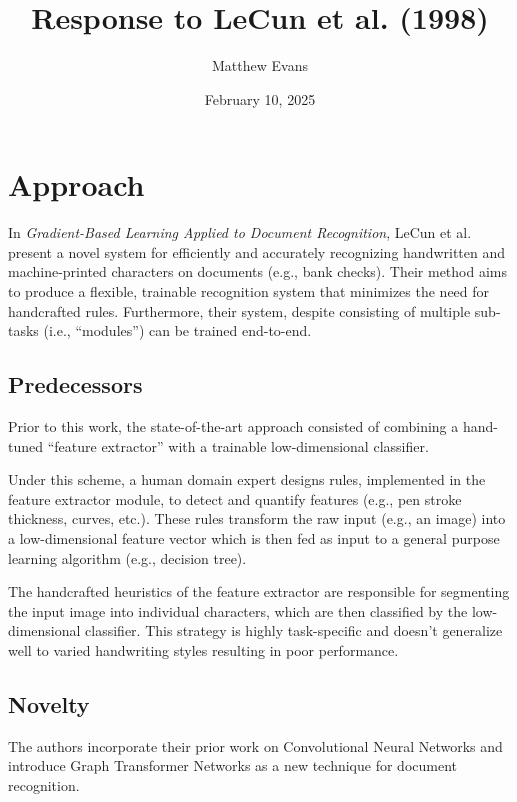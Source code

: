\documentclass[10pt]{article}
\title{
    Response to LeCun et al. (1998) \\
}
\author{Matthew Evans}
\date{February 10, 2025}
\begin{document}
\maketitle

\section*{Approach}
In \textit{Gradient-Based Learning Applied to Document Recognition}\cite{lecun1998gradient}, LeCun et al. present a novel system for efficiently and accurately recognizing handwritten and machine-printed characters on documents (e.g., bank checks). Their method aims to produce a flexible, trainable recognition system that minimizes the need for handcrafted rules. Furthermore, their system, despite consisting of multiple sub-tasks (i.e., ``modules'') can be trained end-to-end.


\subsection*{Predecessors}


Prior to this work, the state-of-the-art approach consisted of combining a hand-tuned ``feature extractor'' with a trainable low-dimensional classifier.

Under this scheme, a human domain expert designs rules, implemented in the feature extractor module, to detect and quantify features (e.g., pen stroke thickness, curves, etc.). These rules transform the raw input (e.g., an image) into a low-dimensional feature vector which is then fed as input to a general purpose learning algorithm (e.g., decision tree).

The handcrafted heuristics of the feature extractor are responsible for segmenting the input image into individual characters, which are then classified by the low-dimensional classifier. This strategy is highly task-specific and doesn't generalize well to varied handwriting styles resulting in poor performance.


\subsection*{Novelty}
The authors incorporate their prior work on Convolutional Neural Networks\cite{10.1162/neco.1989.1.4.541} and introduce Graph Transformer Networks as a new technique for document recognition.
\end{document}
